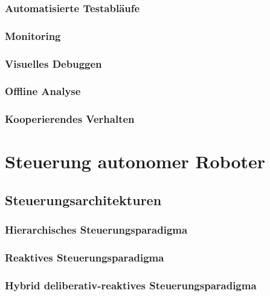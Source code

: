 \documentclass[a4paper, 11pt, accentcolor = tud3b]{tudreport}
\begin{document}
			\subsection{Automatisierte Testabläufe} %

			\subsection{Monitoring} %

			\subsection{Visuelles Debuggen} %

			\subsection{Offline Analyse} %

			\subsection{Kooperierendes Verhalten} %

	\chapter{Steuerung autonomer Roboter} %

		\section{Steuerungsarchitekturen} %

			\subsection{Hierarchisches Steuerungsparadigma} %

			\subsection{Reaktives Steuerungsparadigma} %

			\subsection{Hybrid deliberativ-reaktives Steuerungsparadigma} %
\end{document}
